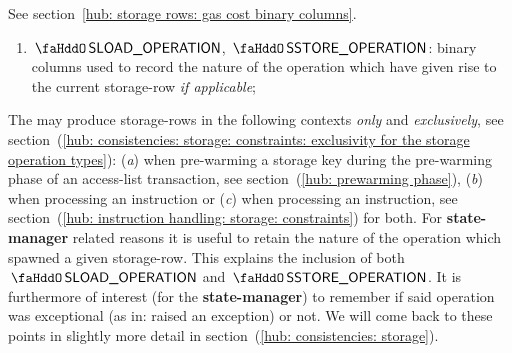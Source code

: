 See section~\ref{hub: storage rows: gas cost binary columns}.
\begin{enumerate}[resume]
	\item
		$\stoSloadOperation$,
		$\stoSstoreOperation$:
		binary columns used to record the nature of the operation which have given rise to the current storage-row \emph{if applicable};
\end{enumerate}
\saNote{} \label{hub: storage rows: metadata for the state manager}
The \zkEvm{} may produce storage-rows in the following contexts \emph{only} and \emph{exclusively},
see section~(\ref{hub: consistencies: storage: constraints: exclusivity for the storage operation types}):
(\emph{a}) when pre-warming a storage key during the pre-warming phase of an access-list transaction, see section~(\ref{hub: prewarming phase}),
(\emph{b}) when processing an  instruction or
(\emph{c}) when processing an  instruction, see section~(\ref{hub: instruction handling: storage: constraints}) for both.
For \textbf{state-manager} related reasons it is useful to retain the nature of the operation which spawned a given storage-row.
This explains the inclusion of both $\stoSloadOperation$ and $\stoSstoreOperation$.
It is furthermore of interest (for the \textbf{state-manager}) to remember if said operation was exceptional (as in: raised an \evm{} exception) or not.
We will come back to these points in slightly more detail in section~(\ref{hub: consistencies: storage}).
